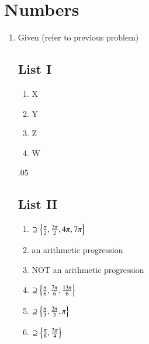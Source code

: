 \documentclass[journal,12pt,twocolumn]{IEEEtran}
\renewcommand\thesection{\arabic{section}}
\begin{document}
\section{Numbers}
\begin{enumerate}[label=\thesection.\arabic*
,ref=\thesection.\theenumi]
\item Given (refer to previous problem)
\\
\noindent\begin{minipage}[t]{0.1\textwidth}
{ \subsection*{List I}}
\begin{enumerate}[align=left,leftmargin=*,label=(\Roman*)]
\item X
\item Y
\item Z
\item W
\end{enumerate}
\end{minipage}%
\kern.05\textwidth%
\begin{minipage}[t]{0.29\textwidth}
{\subsection*{List II}}
\begin{enumerate}[align=left,leftmargin=*,labelsep=1ex, label=(\Alph*), start = 16]
\item $\supseteq \left\{\frac{\pi}{2}, \frac{3\pi}{2}, 4\pi, 7\pi\right\}$
\item an arithmetic progression
\item NOT an arithmetic progression
\item $\supseteq \left\{\frac{\pi}{6}, \frac{7\pi}{6}, \frac{13\pi}{6}\right\}$
\item $\supseteq \left\{\frac{\pi}{3}, \frac{2\pi}{3}, \pi\right\}$
\item $\supseteq \left\{\frac{\pi}{6}, \frac{3\pi}{4}\right\}$
\end{enumerate}
\end{minipage}%
%


\end{enumerate}
\end{document}
